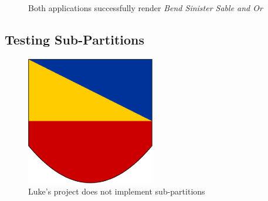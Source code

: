 \begin{figure}[H]
\hfill
{}
\hfill
\caption{Both applications successfully render \emph{Bend Sinister Sable and Or}}
\end{figure}


\subsection{Testing Sub-Partitions}

\begin{figure}[H]
  \centering
    \includegraphics[width=0.5\textwidth]{testing/images/subtom.eps}
  \caption{Luke's project does not implement sub-partitions}
\end{figure}




